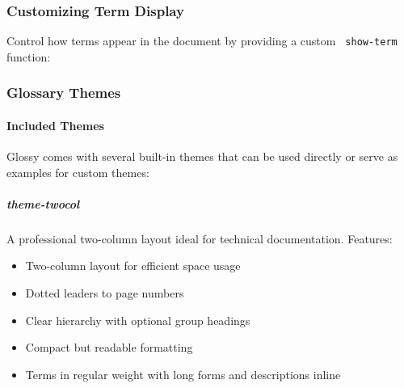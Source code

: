 \subsubsection{Customizing Term Display}\label{customizing-term-display}

Control how terms appear in the document by providing a custom
\texttt{\ show-term\ } function:

\begin{Shaded}
\begin{Highlighting}[]

\NormalTok{)}
\end{Highlighting}
\end{Shaded}

\subsubsection{Glossary Themes}\label{glossary-themes}

\paragraph{Included Themes}\label{included-themes}

Glossy comes with several built-in themes that can be used directly or
serve as examples for custom themes:

\subparagraph{theme-twocol}\label{theme-twocol}

A professional two-column layout ideal for technical documentation.
Features:

\begin{itemize}
\tightlist
\item
  Two-column layout for efficient space usage
\item
  Dotted leaders to page numbers
\item
  Clear hierarchy with optional group headings
\item
  Compact but readable formatting
\item
  Terms in regular weight with long forms and descriptions inline
\end{itemize}

\begin{Shaded}
\begin{Highlighting}[]
\end{Highlighting}
\end{Shaded}

